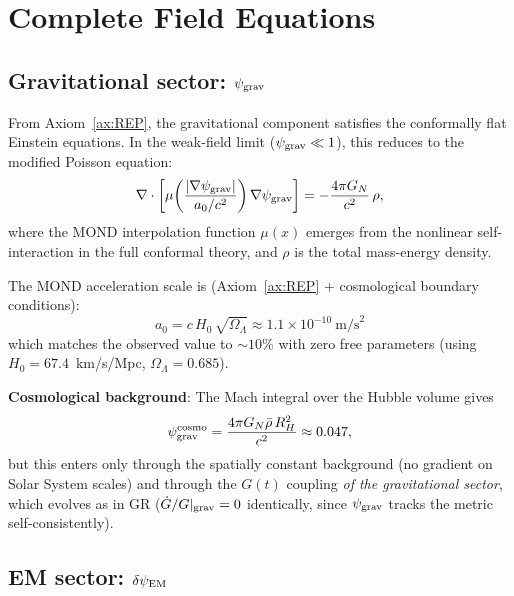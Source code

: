 \documentclass[11pt]{article}
\newcommand{\ee}[1]{\times 10^{#1}}
\newcommand{\psigrav}{\psi_{\rm grav}}
\newcommand{\dpsiEM}{\delta\psi_{\rm EM}}
\newcommand{\GN}{G_N}
\newcommand{\Gdot}{\dot{G}/G}
\newcommand{\aM}{a_0}
\newcommand{\Hzero}{H_0}
\newcommand{\mufd}{\mu}
\newcommand{\RH}{R_H}
\begin{document}
\section{Complete Field Equations}
\label{sec:field-equations}

\subsection{Gravitational sector: $\psigrav$}

From Axiom~\ref{ax:REP}, the gravitational component satisfies the
conformally flat Einstein equations. In the weak-field limit
($\psigrav \ll 1$), this reduces to the modified Poisson equation:
\begin{equation}
\nabla\cdot\left[\mufd\!\left(\frac{|\nabla\psigrav|}{a_0/c^2}\right)
\nabla\psigrav\right] = -\frac{4\pi\GN}{c^2}\,\rho,
\label{eq:grav-Poisson}
\end{equation}
where the MOND interpolation function $\mufd(x)$ emerges from the
nonlinear self-interaction in the full conformal theory, and $\rho$
is the total mass-energy density.

The MOND acceleration scale is (Axiom~\ref{ax:REP} + cosmological
boundary conditions):
\begin{equation}
\boxed{\aM = c\,\Hzero\,\sqrt{\Omega_\Lambda} \approx 1.1\ee{-10}~\text{m/s}^2}
\label{eq:a0-canonical}
\end{equation}
which matches the observed value to $\sim 10\%$ with zero free
parameters (using $\Hzero = 67.4$~km/s/Mpc, $\Omega_\Lambda = 0.685$).

\textbf{Cosmological background}: The Mach integral over the Hubble volume gives
\begin{equation}
\psigrav^{\rm cosmo} = \frac{4\pi\GN\bar{\rho}\,\RH^2}{c^2}
\approx 0.047,
\label{eq:psigrav-cosmo}
\end{equation}
but this enters only through the spatially constant background
(no gradient on Solar System scales) and through the $G(t)$ coupling
\emph{of the gravitational sector}, which evolves as in GR
($\Gdot|_{\rm grav} = 0$ identically, since $\psigrav$ tracks the
metric self-consistently).

\subsection{EM sector: $\dpsiEM$}
\end{document}

